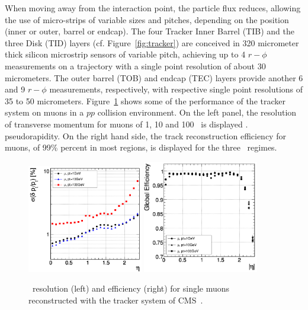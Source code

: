  When moving away from the interaction point, the
particle flux reduces, allowing the use of micro-strips of variable
sizes and pitches, depending on the position (inner or outer, barrel
or endcap). The four Tracker Inner Barrel (TIB) and the three Disk
(TID) layers (cf. Figure~\ref{fig:tracker}) are conceived in 320
micrometer thick silicon microstrip sensors of variable pitch,
achieving up to 4 $r-\phi$ measurements on a trajectory with a single
point resolution of about 30 micrometers. The outer barrel (TOB) and
endcap (TEC) layers provide another 6 and 9 $r-\phi$ measurements,
respectively, with respective single point resolutions of 35 to 50
micrometers. Figure~\ref{fig:trkperf} shows some of the performance of
the tracker system on muons in a $pp$ collision environment. On the left panel, the resolution of
transverse momentum for muons of 1, 10 and 100 \GeVc~is displayed
\vs. pseudorapidity. On the right hand side, the track reconstruction
efficiency for muons, of 99\% percent in most regions, is displayed
for the three \pt~regimes.


\begin{figure}[htb]
  \begin{center}
    \includegraphics[width=0.45\textwidth]{Chapters/xLHCMS/trackermuonpt.png}
    \includegraphics[width=0.45\textwidth]{Chapters/xLHCMS/trackermuoneff.png}
    \caption{\pt~resolution (left) and efficiency (right) for single muons
      reconstructed with the tracker system of CMS~\cite{Chatrchyan:2008aa}.}
    \label{fig:trkperf}
  \end{center}
\end{figure}




